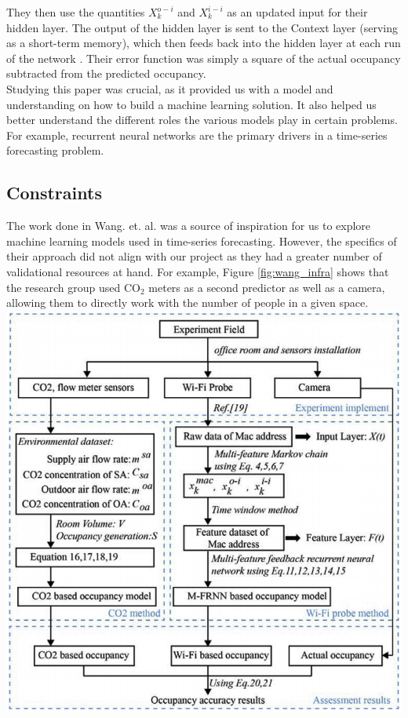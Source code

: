\documentclass[journal, 12pt]{IEEEtran}
\begin{document}
\medskip
\noindent They then use the quantities $X_{k}^{o-i}$ and $X_{k}^{i-i}$ as an updated input for their hidden layer. The output of the hidden layer is sent to the Context layer (serving as a short-term memory), which then feeds back into the hidden layer at each run of the network \cite{wang2018occupancy}. Their error function was simply a square of the actual occupancy subtracted from the predicted occupancy\cite{wang2018occupancy}.\\

Studying this paper was crucial, as it provided us with a model and understanding on how to build a machine learning solution. It also helped us better understand the different roles the various models play in certain problems. For example, recurrent neural networks are the primary drivers in a time-series forecasting problem.

\subsection{Constraints}

\noindent The work done in Wang. et. al. was a source of inspiration for us to explore machine learning models used in time-series forecasting. However, the specifics of their approach did not align with our project as they had a greater number of validational resources at hand. For example, Figure \ref{fig:wang_infra} shows that the research group used CO$_2$ meters as a second predictor as well as a camera, allowing them to directly work with the number of people in a given space.\\

\begingroup
    \centering
    \medskip
    \includegraphics[width=\columnwidth]{./images/wang_model.png}
    \label{fig:wang_infra}
    \medskip
\endgroup
\end{document}
